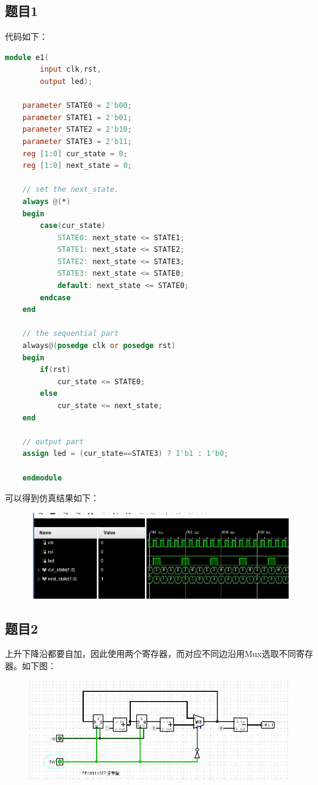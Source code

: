 \documentclass[UTF8]{article}
\begin{document}
	\subsection{题目1}
	代码如下：\par
	\begin{lstlisting}[language=Verilog]
	module e1(
		input clk,rst,
		output led);
	
	parameter STATE0 = 2'b00;
	parameter STATE1 = 2'b01;
	parameter STATE2 = 2'b10;
	parameter STATE3 = 2'b11;
	reg [1:0] cur_state = 0;
	reg [1:0] next_state = 0;
	
	// set the next_state.
	always @(*)
	begin
		case(cur_state)
			STATE0: next_state <= STATE1;
			STATE1: next_state <= STATE2;
			STATE2: next_state <= STATE3;
			STATE3: next_state <= STATE0;
			default: next_state <= STATE0;
		endcase
	end
	
	// the sequential part
	always@(posedge clk or posedge rst)
	begin
		if(rst)
			cur_state <= STATE0;
		else
			cur_state <= next_state;
	end
	
	// output part
	assign led = (cur_state==STATE3) ? 1'b1 : 1'b0;
	
	endmodule
	\end{lstlisting}
	可以得到仿真结果如下：\par
	\begin{figure}[H]
		\centering
		\includegraphics[width=1\linewidth]{e1_1.jpg}
		\label{e1_1}
	\end{figure}\par
	
	\subsection{题目2}
	上升下降沿都要自加，因此使用两个寄存器，而对应不同边沿用Mux选取不同寄存器。如下图：\par
	\begin{figure}[H]
		\centering
		\includegraphics[width=1\linewidth]{e2.jpg}
		\label{e2}
	\end{figure}\par
\end{document}
